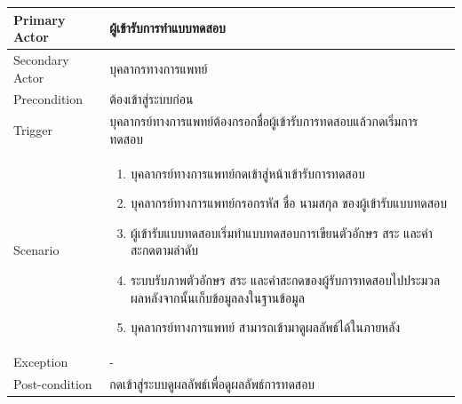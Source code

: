 \documentclass[12pt,oneside,openright,a4paper]{cpe-thai-project}
\begin{document}
\begin{itemize}
\begin{table}[!h]
\begin{tabular}{|p{4cm}|p{10cm}|}
      Primary Actor & ผู้เข้ารับการทำแบบทดสอบ \\ \hline
      Secondary Actor & บุคลากรทางการแพทย์ \\ \hline
      Precondition & ต้องเข้าสู่ระบบก่อน \\ \hline
      Trigger & บุคลากรย์ทางการแพทย์ต้องกรอกชื่อผู้เข้ารับการทดสอบแล้วกดเริ่มการทดสอบ \\ \hline
      Scenario & \begin{enumerate}
        \item บุคลากรย์ทางการแพทย์กดเข้าสู่หน้าเข้ารับการทดสอบ
        \item บุคลากรย์ทางการแพทย์กรอกรหัส ชื่อ นามสกุล ของผู้เข้ารับแบบทดสอบ
        \item ผู้เข้ารับแบบทดสอบเริ่มทำแบบทดสอบการเขียนตัวอักษร สระ และคำสะกดตามลำดับ
        \item ระบบรับภาพตัวอักษร สระ และคำสะกดของผู้รับการทดสอบไปประมวลผลหลังจากนั้นเก็บข้อมูลลงในฐานข้อมูล
        \item บุคลากรย์ทางการแพทย์ สามารถเข้ามาดูผลลัพธ์ได้ในภายหลัง
      \end{enumerate} \\ \hline
      Exception & - \\ \hline
      Post-condition & กดเข้าสู่ระบบดูผลลัพธ์เพื่อดูผลลัพธ์การทดสอบ\\ \hline
      

\end{tabular}
\end{table}
\end{itemize}
\end{document}
